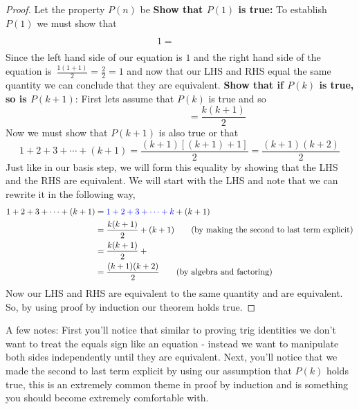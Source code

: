 \documentclass[addpoints]{exam}
\begin{document}
    \begin{proof}
      Let the property $P(n)$ be 
      \vspace{0.5in}
      \newline\textbf{Show that $P(1)$ is true:} To establish $P(1)$ we must show that 
      \[
        1 = \phantom{\frac{1(2)}{2}}
      \]
      Since the left hand side of our equation is $1$ and the right hand side of the equation is $\displaystyle\,\frac{1(1+1)}{2}=\frac{2}{2} = 1$ and now that our LHS and RHS equal the same quantity we can conclude that they are equivalent.
      \newline\textbf{Show that if $P(k)$ is true, so is $P(k+1)$}: First lets assume that $P(k)$ is true and so 
      \[
      \phantom{1 + 2 + 3 + \cdots + k} = \frac{k(k+1)}{2}
      \]
      Now we must show that $P(k+1)$ is also true or that
      \[
        1 + 2 + 3 + \cdots + (k+1) = \frac{\left(k+1\right)\left[\left(k+1\right)+1\right]}{2} = \frac{\left(k+1\right)\left(k+2\right)}{2}
      \]
      Just like in our basis step, we will form this equality by showing that the LHS and the RHS are equivalent. We will start with the LHS and note that we can rewrite it in the following way,
      \begin{align*}
        1 + 2 + 3 + \cdots + (k+1) &= \textcolor{blue}{1 + 2 + 3 + \cdots + k} + (k + 1) \\ 
        &= \frac{k(k+1)}{2} + (k+1) \tag{by making the second to last term explicit} \\ 
        &= \frac{k(k+1)}{2} + \phantom{\frac{2(k+1)}{2}} \\ 
        &= \frac{(k+1)(k+2)}{2} \tag{by algebra and factoring}
      \end{align*}
      Now our LHS and RHS are equivalent to the same quantity and are equivalent. So, by using proof by induction our theorem holds true.
    \end{proof}
    \fi
    \noindent\makebox[\linewidth]{\hrulefill}
    \vspace{0.1in}
    \newline A few notes: First you'll notice that similar to proving trig identities we don't want to treat the equals sign like an equation - instead we want to manipulate both sides independently until they are equivalent. Next, you'll notice that we made the second to last term explicit by using our assumption that $P(k)$ holds true, this is an extremely common theme in proof by induction and is something you should become extremely comfortable with.
    \noindent\makebox[\linewidth]{\hrulefill}
\end{document}

